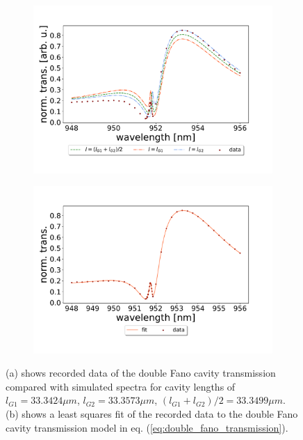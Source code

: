 \begin{figure}[h!]
    \centering
    \begin{subfigure}[b]{0.49\textwidth}
        \centering
        \includegraphics[width=\textwidth]{figures/results/34um_long_scan_sim_comparison.pdf}
        \caption{}
        \label{fig:34um_long_scan_sim_comparison}
    \end{subfigure}
    \begin{subfigure}[b]{0.49\textwidth}
        \centering
        \includegraphics[width=\textwidth]{figures/results/34um_long_scan_fit.pdf}
        \caption{}
        \label{fig:34um_long_scan_fit}
    \end{subfigure}
    \caption{(a) shows recorded data of the double Fano cavity transmission compared with simulated spectra for cavity lengths of $l_{G1} = 33.3424 \mu m$, $l_{G2} = 33.3573 \mu m$, $(l_{G1} + l_{G2})/2 = 33.3499 \mu m$. (b) shows a least squares fit of the recorded data to the double Fano cavity transmission model in eq. (\ref{eq:double_fano_transmission}).}
    \label{fig:34um_cavity_fit_and_sim}
\end{figure}

